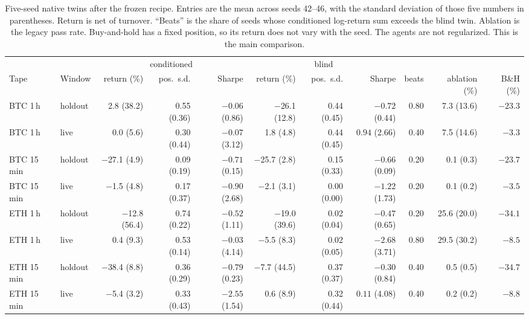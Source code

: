 \documentclass[conference]{IEEEtran}
\begin{document}
\begin{table}[t]
\caption{Five-seed native twins after the frozen recipe. Entries are the mean across seeds 42--46, with the standard deviation of those five numbers in parentheses. Return is net of turnover. ``Beats'' is the share of seeds whose conditioned log-return sum exceeds the blind twin. Ablation is the legacy pass rate. Buy-and-hold has a fixed position, so its return does not vary with the seed. The agents are not regularized. This is the main comparison.}
\label{tab:v2seeds}
\centering
\footnotesize
\setlength{\tabcolsep}{3pt}
\begin{tabular}{@{}ll rrr rrr r r r@{}}
\toprule
 & & \multicolumn{3}{c}{conditioned} & \multicolumn{3}{c}{blind} & & & \\
\cmidrule(lr){3-5}\cmidrule(lr){6-8}
Tape & Window & return (\%) & pos.\ s.d. & Sharpe & return (\%) & pos.\ s.d. & Sharpe & beats & ablation (\%) & B\&H (\%)\\
\midrule
BTC 1\,h & holdout & 2.8 (38.2) & 0.55 (0.36) & $-0.06$ (0.86) & $-$26.1 (12.8) & 0.44 (0.45) & $-0.72$ (0.44) & 0.80 & 7.3 (13.6) & $-23.3$\\
BTC 1\,h & live & 0.0 (5.6) & 0.30 (0.44) & $-0.07$ (3.12) & 1.8 (4.8) & 0.44 (0.45) & $0.94$ (2.66) & 0.40 & 7.5 (14.6) & $-3.3$\\
BTC 15\,min & holdout & $-$27.1 (4.9) & 0.09 (0.19) & $-0.71$ (0.15) & $-$25.7 (2.8) & 0.15 (0.33) & $-0.66$ (0.09) & 0.20 & 0.1 (0.3) & $-23.7$\\
BTC 15\,min & live & $-$1.5 (4.8) & 0.17 (0.37) & $-0.90$ (2.68) & $-$2.1 (3.1) & 0.00 (0.00) & $-1.22$ (1.73) & 0.20 & 0.1 (0.2) & $-3.5$\\
ETH 1\,h & holdout & $-$12.8 (56.4) & 0.74 (0.22) & $-0.52$ (1.11) & $-$19.0 (39.6) & 0.02 (0.04) & $-0.47$ (0.65) & 0.20 & 25.6 (20.0) & $-34.1$\\
ETH 1\,h & live & 0.4 (9.3) & 0.53 (0.14) & $-0.03$ (4.14) & $-$5.5 (8.3) & 0.02 (0.05) & $-2.68$ (3.71) & 0.80 & 29.5 (30.2) & $-8.5$\\
ETH 15\,min & holdout & $-$38.4 (8.8) & 0.36 (0.29) & $-0.79$ (0.23) & $-$7.7 (44.5) & 0.37 (0.37) & $-0.30$ (0.84) & 0.40 & 0.5 (0.5) & $-34.7$\\
ETH 15\,min & live & $-$5.4 (3.2) & 0.33 (0.43) & $-2.55$ (1.54) & 0.6 (8.9) & 0.32 (0.44) & $0.11$ (4.08) & 0.40 & 0.2 (0.2) & $-8.8$\\
\bottomrule
\end{tabular}
\end{table}
\end{document}
